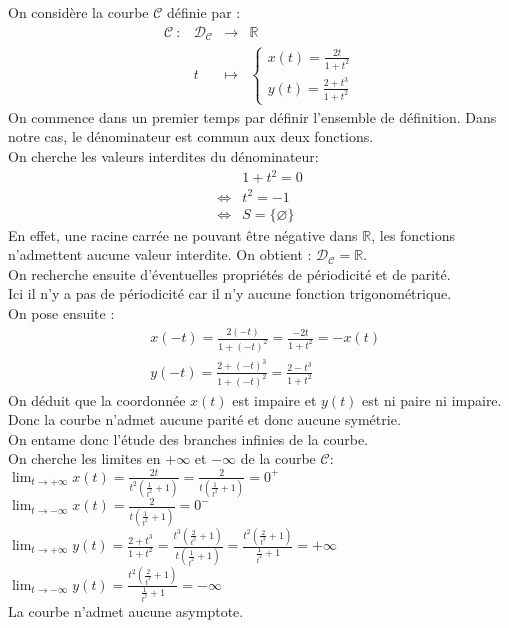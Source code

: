 \begin{ex}

On considère la courbe $\mathscr{C}$ définie par :
$$\begin{array}{cccc}
    \mathscr{C} \ : & \mathscr{D}_{\mathscr{C}} & \to & \mathbb{R} \\
         & t & \mapsto & \begin{cases}\displaystyle x(t)=\frac{2t}{1+t^2}\\\displaystyle y(t)=\frac{2+t^3}{1+t^2}\end{cases}
\end{array}$$
On commence dans un premier temps par définir l'ensemble de définition.
Dans notre cas, le dénominateur est commun aux deux fonctions.\\
On cherche les valeurs interdites du dénominateur:
\begin{align*}
    & 1+t^2=0\\
    \Leftrightarrow & t^2=-1\\
    \Leftrightarrow & S=\{\varnothing\}
\end{align*}
En effet, une racine carrée ne pouvant être négative dans $\mathbb{R}$, les fonctions n'admettent aucune valeur interdite.
On obtient : $\mathscr{D}_\mathscr{C}=\mathbb{R}$.\\
On recherche ensuite d'éventuelles propriétés de périodicité et de parité.\\
Ici il n'y a pas de périodicité car il n'y aucune fonction trigonométrique.\\
On pose ensuite :
\begin{align*}
& x(-t)=\frac{2(-t)}{1+(-t)^2}=\frac{-2t}{1+t^2}=-x(t)\\
& y(-t)=\frac{2+(-t)^3}{1+(-t)^2}=\frac{2-t^3}{1+t^2}
\end{align*}
On déduit que la coordonnée $x(t)$ est impaire et $y(t)$ est ni paire ni impaire.\\
Donc la courbe n'admet aucune parité et donc aucune symétrie.\\

On entame donc l'étude des branches infinies de la courbe.\\
On cherche les limites en $+\infty$ et $-\infty$ de la courbe $\mathscr{C}$:\\
${\displaystyle \lim_{t\to +\infty}}x(t)=\frac{2t}{t^2\left(\frac{1}{t^2}+1\right)}=\frac{2}{t\left(\frac{1}{t^2}+1\right)}=0^{+}$\\
$\displaystyle\lim_{t\to-\infty}x(t)=\frac{2}{t\left(\frac{1}{t^2}+1\right)}=0^{-}$\\
$\displaystyle\lim_{t\to +\infty}y(t)=\frac{2+t^3}{1+t^2}=\frac{t^3\left(\frac{2}{t^3}+1\right)}{t\left(\frac{1}{t^2}+1\right)}=\frac{t^2\left(\frac{2}{t^3}+1\right)}{\frac{1}{t^2}+1}=+\infty$\\
$\displaystyle\lim_{t\to -\infty}y(t)=\frac{t^2\left(\frac{2}{t^3}+1\right)}{\frac{1}{t^2}+1}=-\infty$\\
La courbe n'admet aucune asymptote.\\


\end{ex}
